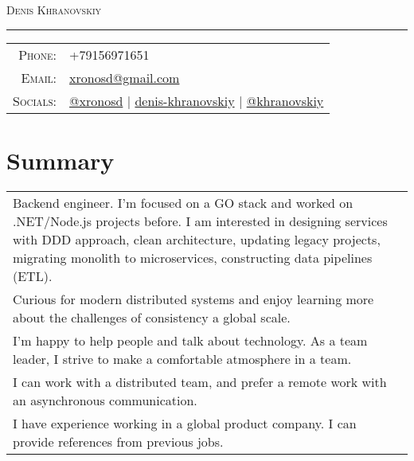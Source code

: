 \documentclass[a4paper,11pt]{article}
\newcommand{\sotag}[1]{\tikz[baseline]{\node[anchor=base, rounded corners=0.5ex, text height=1.5ex, text depth=.25ex, fill=tagbg, draw=tagbg, text=tagtxt] {#1};}}
\begin{document}
\par{\centering
		{\Huge \textsc{Denis Khranovskiy}
	}\bigskip\par}

\hrule
\vspace{0.5em}
\begin{tabular}{rl}
  \textsc{Phone:}     & +79156971651\\
  \textsc{Email:}     & \href{mailto:xronosd@gmail.com}{xronosd@gmail.com}\\
  \textsc{Socials:}   %
                      & \faTwitter{} \href{https://twitter.com/xronosd}{@xronosd} 
                      | \faLinkedin{} \href{https://www.linkedin.com/in/denis-khranovskiy/}{denis-khranovskiy}
                      | \faGithub{} \href{https://github.com/khranovskiy/}{@khranovskiy}
\end{tabular}

\section{Summary}
\begin{tabular}{p{}}
  Backend engineer. I'm focused on a GO stack and worked on .NET/Node.js projects before. I am interested in designing services with DDD approach, clean architecture, updating legacy projects, migrating monolith to microservices, constructing data pipelines (ETL). \\ 
  Curious for modern distributed systems and enjoy learning more about the challenges of consistency a global scale. \\  
  I'm happy to help people and talk about technology. As a team leader, I strive to make a comfortable atmosphere in a team. \\
  I can work with a distributed team, and prefer a remote work with an asynchronous communication. \\ 
  I have experience working in a global product company. I can provide references from previous jobs.
\end{tabular}
\end{document}
